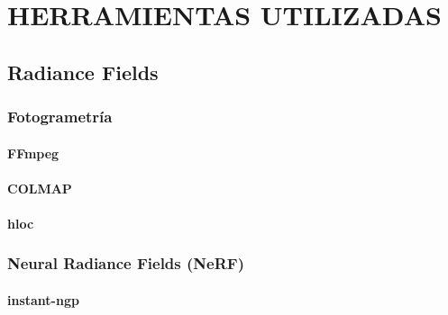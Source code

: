\documentclass[a4paper, 12pt, spanish, twoside]{article}
\begin{document}
\newpage
\section{HERRAMIENTAS UTILIZADAS} \label{sec:herramientas}



\subsection{Radiance Fields} \label{sec:herramientas:radfi}

\subsubsection{Fotogrametría} \label{sec:herramientas:radfi:fotogram}

\paragraph{FFmpeg} \label{sec:herramientas:radfi:fotogram:ffmpeg}

\paragraph{COLMAP} \label{sec:herramientas:radfi:fotogram:colmap}

\paragraph{hloc} \label{sec:herramientas:radfi:fotogram:hloc}

\subsubsection{Neural Radiance Fields (NeRF)} \label{sec:herramientas:radfi:nerf}

\paragraph{instant-ngp} \label{sec:herramientas:radfi:nerf:instant-ngp}
\end{document}
